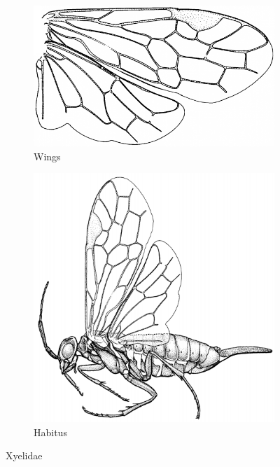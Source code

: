 \documentclass[letterpaper, 11pt]{article}
\begin{document}
\begin{figure}[ht!]
    \centering
    \begin{subfigure}[ht!]{0.4\textwidth}
        \includegraphics[width=\textwidth]{XyelidWings}
        \caption{Wings \citep[][modified from Fig. 32]{goulet1993hymenoptera}}
        \label{fig:xyelidwings}
    \end{subfigure}
    \hfill 
    \begin{subfigure}[ht!]{0.42\textwidth}
        \includegraphics[width=\textwidth]{XyelidHabitus}
        \caption{Habitus \citep[][Fig. 32]{goulet1993hymenoptera}}
        \label{fig:xyelidhead}
    \end{subfigure}
    \caption{Xyelidae}\label{fig:xyelid1}
\end{figure}
\end{document}
